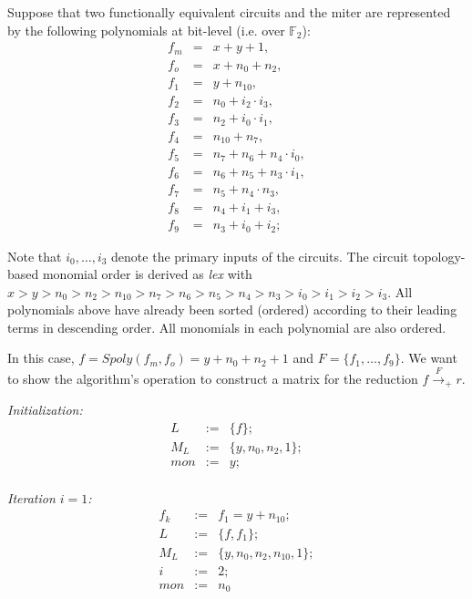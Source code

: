 \begin{Example}\label{exp:consmatix}
	Suppose that two functionally equivalent circuits and the
        miter are  represented by the following polynomials at
        bit-level (i.e. over $\mathbb{F}_2$):
	\begin{eqnarray}
		f_m&=&x+y+1, \nonumber \\
		f_o&=&x+n_0+n_2, \nonumber \\
		f_1&=&y+n_{10}, \nonumber \\
		f_2&=&n_0+i_2\cdot i_3, \nonumber \\
		f_3&=&n_2+i_0\cdot i_1, \nonumber \\
		f_4&=&n_{10}+n_7, \nonumber \\
		f_{5}&=&n_7+n_6+n_4\cdot i_0, \nonumber \\
		f_{6}&=&n_6+n_5+n_3\cdot i_1, \nonumber \\
		f_{7}&=&n_5+n_4\cdot n_3,  \nonumber \\
		f_{8}&=&n_4+i_1+i_3, \nonumber \\
		f_{9}&=&n_3+i_0+i_2;\nonumber 
	\end{eqnarray}
	
        Note that $i_0, \dots, i_3$ denote the primary inputs of the
        circuits. The circuit topology-based monomial order is derived
        as {\it lex} with
        $x>y>n_0>n_2>n_{10}>n_7>n_6>n_5>n_4>n_3>i_0>i_1>i_2>i_3$. 
	All polynomials above have already been sorted (ordered) according to their
        leading terms in descending order. All monomials in each
        polynomial are also ordered. 
	
	In this case, $f=Spoly(f_{m},f_{o})=y+n_0+n_2+1$ and
        $F=\{f_{1},\dots, f_{9}\}$.  We want to show the algorithm's
        operation to construct a matrix for the reduction $f
        \xrightarrow{F}_{+}r$.  
	
		
	{\it Initialization:}
	\begin{eqnarray}
		L&:=&\{f\}; \nonumber \\
		M_{L}&:=&\{ y,n_0,n_2,1\}; \nonumber \\
		mon&:=& y ;\nonumber
	\end{eqnarray}\\
	
	{\it Iteration $i=1$:}	
	\begin{eqnarray}
		f_{k}&:=&f_{1}=y+n_{10}; \nonumber \\
		L&:=&\{f,f_1\}; \nonumber \\
		M_{L}&:=&\{ y,n_0,n_2,n_{10},1\}; \nonumber \\
		i&:=&2;  \nonumber \\
		mon&:=& n_0\nonumber 
	\end{eqnarray}\\
	

\end{Example}
